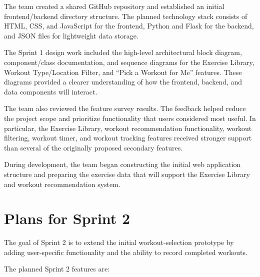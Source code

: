 \documentclass[11pt]{article}
\begin{document}
The team created a shared GitHub repository and established an initial frontend/backend directory structure. The planned technology stack consists of HTML, CSS, and JavaScript for the frontend, Python and Flask for the backend, and JSON files for lightweight data storage.

The Sprint 1 design work included the high-level architectural block diagram, component/class documentation, and sequence diagrams for the Exercise Library, Workout Type/Location Filter, and ``Pick a Workout for Me'' features. These diagrams provided a clearer understanding of how the frontend, backend, and data components will interact.

The team also reviewed the feature survey results. The feedback helped reduce the project scope and prioritize functionality that users considered most useful. In particular, the Exercise Library, workout recommendation functionality, workout filtering, workout timer, and workout tracking features received stronger support than several of the originally proposed secondary features.

During development, the team began constructing the initial web application structure and preparing the exercise data that will support the Exercise Library and workout recommendation system.

\newpage


\section{Plans for Sprint 2}

The goal of Sprint 2 is to extend the initial workout-selection prototype by adding user-specific functionality and the ability to record completed workouts.

The planned Sprint 2 features are:
\end{document}
